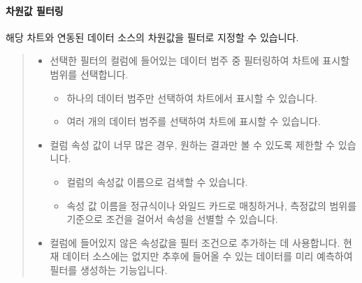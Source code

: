 \documentclass[letterpaper,10pt,english]{sphinxmanual}
\begin{document}
\paragraph{차원값 필터링}
\label{\detokenize{discovery/part04/chart_filter:id5}}
해당 차트와 연동된 데이터 소스의 차원값을 필터로 지정할 수 있습니다.
\begin{quote}

\begin{figure}[H]
\centering

\noindent{}
\end{figure}
\begin{itemize}
\item {} 
 선택한 필터의 컬럼에 들어있는 데이터 범주 중 필터링하여 차트에 표시할 범위를 선택합니다.
\begin{itemize}
\item {} 
 하나의 데이터 범주만 선택하여 차트에서 표시할 수 있습니다.

\item {} 
 여러 개의 데이터 범주를 선택하여 차트에 표시할 수 있습니다.

\end{itemize}

\item {} 
 컬럼 속성 값이 너무 많은 경우, 원하는 결과만 볼 수 있도록 제한할 수 있습니다.
\begin{itemize}
\item {} 
 컬럼의 속성값 이름으로 검색할 수 있습니다.

\item {} 
 속성 값 이름을 정규식이나 와일드 카드로 매칭하거나, 측정값의 범위를 기준으로 조건을 걸어서 속성을 선별할 수 있습니다.

\end{itemize}

\end{itemize}

\begin{figure}[H]
\centering

\noindent{}
\end{figure}
\begin{itemize}
\item {} 
 컬럼에 들어있지 않은 속성값을 필터 조건으로 추가하는 데 사용합니다. 현재 데이터 소스에는 없지만 추후에 들어올 수 있는 데이터를 미리 예측하여 필터를 생성하는 기능입니다.

\end{itemize}
\end{quote}
\end{document}
